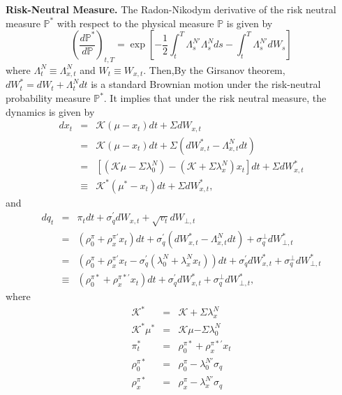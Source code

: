 \documentclass{article}
\begin{document}
\textbf{Risk-Neutral Measure.} The Radon-Nikodym derivative of the risk
neutral measure $\mathbb{P}^{\ast }$ with respect to the physical measure $%
\mathbb{P}$ is given by%
\begin{equation}
\left( \frac{d\mathbb{P}^{\ast }}{d\mathbb{P}}\right) _{t,T}=\exp \left[ -%
\frac{1}{2}\int_{t}^{T}\Lambda _{s}^{N\prime }\Lambda
_{s}^{N}ds-\int_{t}^{T}\Lambda _{s}^{N\prime }dW_{s}\right] 
\end{equation}%
where $\Lambda _{t}^{N}\equiv \Lambda _{x,t}^{N}$ and $W_{t}\equiv W_{x,t}$.
Then,By the Girsanov theorem, $dW_{t}^{\ast }=dW_{t}+\Lambda _{t}^{N}dt$ is
a standard Brownian motion under the risk-neutral probability measure $%
\mathbb{P}^{\ast }$. It implies that under the risk neutral measure, the
dynamics is given by%
\begin{eqnarray*}
dx_{t} &=&\mathcal{K}\left( \mu -x_{t}\right) dt+\Sigma dW_{x,t} \\
&=&\mathcal{K}\left( \mu -x_{t}\right) dt+\Sigma \left( dW_{x,t}^{\ast
}-\Lambda _{x,t}^{N}dt\right)  \\
&=&\left[ \left( \mathcal{K}\mu -\Sigma \lambda _{0}^{N}\right) -\left( 
\mathcal{K}+\Sigma \lambda _{x}^{N}\right) x_{t}\right] dt+\Sigma
dW_{x,t}^{\ast } \\
&\equiv &\mathcal{K}^{\ast }\left( \mu ^{\ast }-x_{t}\right) dt+\Sigma
dW_{x,t}^{\ast },
\end{eqnarray*}%
and%
\begin{eqnarray*}
dq_{t} &=&\pi _{t}dt+\sigma _{q}^{\prime }dW_{x,t}+\sqrt{v_{t}}dW_{\bot ,t}
\\
&=&\left( \rho _{0}^{\pi }+\rho _{x}^{\pi \prime }x_{t}\right) dt+\sigma
_{q}^{\prime }\left( dW_{x,t}^{\ast }-\Lambda _{x,t}^{N}dt\right) +\sigma
_{q}^{\bot }dW_{\bot ,t}^{\ast } \\
&=&\left( \rho _{0}^{\pi }+\rho _{x}^{\pi \prime }x_{t}-\sigma _{q}^{\prime
}\left( \lambda _{0}^{N}+\lambda _{x}^{N}x_{t}\right) \right) dt+\sigma
_{q}^{\prime }dW_{x,t}^{\ast }+\sigma _{q}^{\bot }dW_{\bot ,t}^{\ast } \\
&\equiv &\left( \rho _{0}^{\pi \ast }+\rho _{x}^{\pi \ast \prime
}x_{t}\right) dt+\sigma _{q}^{\prime }dW_{x,t}^{\ast }+\sigma _{q}^{\bot
}dW_{\bot ,t}^{\ast },
\end{eqnarray*}%
where 
\begin{eqnarray*}
\mathcal{K}^{\ast } &=&\mathcal{K+}\Sigma \lambda _{x}^{N} \\
\mathcal{K}^{\ast }\mu ^{\ast } &=&\mathcal{K}\mu \mathcal{-}\Sigma \lambda
_{0}^{N} \\
\pi _{t}^{\ast } &=&\rho _{0}^{\pi \ast }+\rho _{x}^{\pi \ast \prime }x_{t}
\\
\rho _{0}^{\pi \ast } &=&\rho _{0}^{\pi }-\lambda _{0}^{N\prime }\sigma _{q}
\\
\rho _{x}^{\pi \ast } &=&\rho _{x}^{\pi }-\lambda _{x}^{N\prime }\sigma _{q}
\end{eqnarray*}
\end{document}
